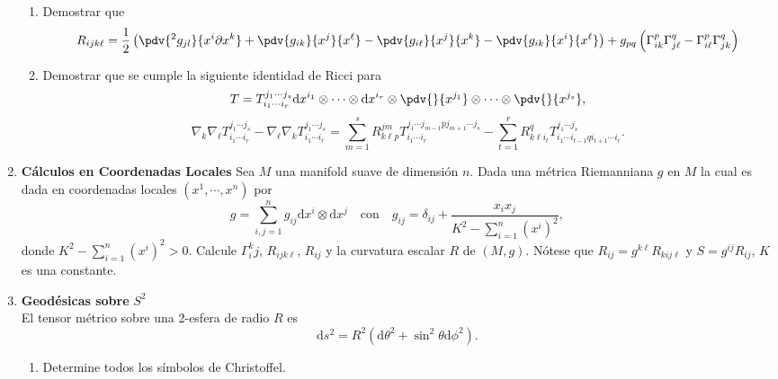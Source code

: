 \documentclass[../main]{subfiles}
\begin{document}
\begin{enumerate}
\begin{enumerate}[label=(\alph*)]
        \item Demostrar que 
        \begin{equation}
            R_{ijk\ell} = \dfrac{1}{2}\left(\pdv{^2 g_{jl}}{x^{i}\partial x^k}+\pdv{g_{ik}}{x^j}{x^{\ell}}-\pdv{g_{i\ell}}{x^j}{x^k}-\pdv{g_{ik}}{x^{i}}{x^{\ell}}\right)+g_{pq}\left(\Gamma^p_{ik}\Gamma^q_{j\ell}-\Gamma^p_{i\ell}\Gamma^q_{jk}\right)
        \end{equation}
        \item Demostrar que se cumple la siguiente identidad de Ricci para 
        \begin{equation}
            T=T^{j_1 \cdots j_s}_{i_1 \cdots i_r}\mathrm{d}x^{i_1}\otimes \cdots \otimes \mathrm{d}x^{i_r}\otimes \pdv{}{x^{j_1}}\otimes \cdots \otimes \pdv{}{x^{j_s}},
        \end{equation}
        \begin{equation}
            \nabla_k \nabla_{\ell} T^{j_1 \cdots j_s}_{i_1 \cdots i_r}-\nabla_{\ell}\nabla_k T^{j_1 \cdots j_s}_{i_1 \cdots i_r}=\sum_{m=1}^s R^{jm}_{k\ell p} T^{j_1 \cdots j_{m-1}p j_{m+1}\cdots j_s}_{i_1\cdots i_r}-\sum_{t=1}^r R^q_{k\ell i_t}T^{j_1 \cdots j_s}_{i_1 \cdots i_{t-1}q i_{t+1}\cdots i_r}.
        \end{equation}
    \end{enumerate}
    \item \textbf{Cálculos en Coordenadas Locales}
    Sea $M$ una manifold suave de dimensión $n$. Dada una métrica Riemanniana $g$ en $M$ la cual es dada en coordenadas locales $(x^1, \cdots, x^n)$ por 
    \begin{equation}
        g=\sum_{i, j=1}^n g_{ij} \mathrm{d}x^{i} \otimes \mathrm{d}x^{j}\quad \text{con} \quad g_{ij}=\delta_{ij}+\dfrac{x_i x_j}{K^2-\sum_{i=1}^n (x^{i})^2},
    \end{equation}
    donde $K^2-\sum_{i=1}^n (x^{i})^2>0$. Calcule $\Gamma^k_ij$, $R_{ijk\ell}$, $R_{ij}$ y la curvatura escalar $R$ de $(M, g)$. Nótese que $R_{ij}=g^{k\ell} R_{kij\ell}$ y $S=g^{ij}R_{ij}$, $K$ es una constante. 
    \item \textbf{Geodésicas sobre } $S^2$\\
    El tensor métrico sobre una 2-esfera de radio $R$ es 
    \begin{equation}
        \mathrm{d}s^2=R^2(\mathrm{d}\theta^2+\sin^2 \theta \mathrm{d}\phi^2).
    \end{equation}
    \begin{enumerate}[label=(\alph*)]
        \item Determine todos los símbolos de Christoffel.

\end{enumerate}
\end{enumerate}
\end{document}

